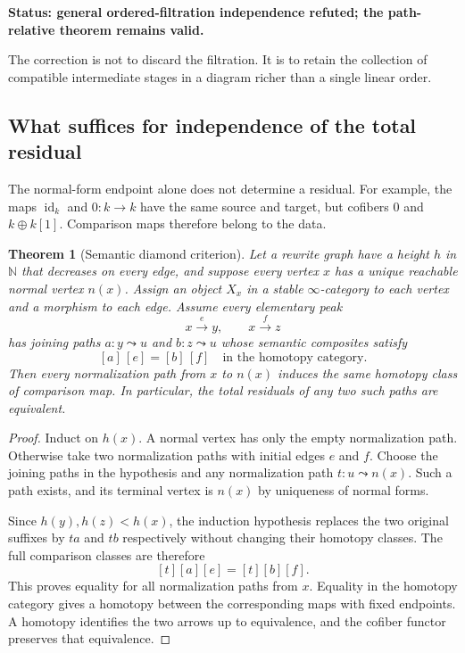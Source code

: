 \documentclass[11pt]{article}
\newtheorem{theorem}{Theorem}[section]
\theoremstyle{definition}
\theoremstyle{remark}
\newcommand{\id}{\operatorname{id}}
\newcommand{\status}[1]{\textbf{Status: #1.}}
\begin{document}
\status{general ordered-filtration independence refuted; the path-relative theorem remains valid}

The correction is not to discard the filtration. It is to retain the collection of compatible intermediate stages in a diagram richer than a single linear order.

\subsection{What suffices for independence of the total residual}

The normal-form endpoint alone does not determine a residual. For example, the maps $\id_k$ and $0:k\to k$ have the same source and target, but cofibers $0$ and $k\oplus k[1]$. Comparison maps therefore belong to the data.

\begin{theorem}[Semantic diamond criterion]\label{thm:semantic-diamond}
Let a rewrite graph have a height $h$ in $\mathbb N$ that decreases on every edge, and suppose every vertex $x$ has a unique reachable normal vertex $n(x)$. Assign an object $X_x$ in a stable $\infty$-category to each vertex and a morphism to each edge. Assume every elementary peak
\[
x\xrightarrow{e}y,\qquad x\xrightarrow{f}z
\]
has joining paths $a:y\leadsto u$ and $b:z\leadsto u$ whose semantic composites satisfy
\[
[a]\,[e]=[b]\,[f]\quad\text{in the homotopy category}.
\]
Then every normalization path from $x$ to $n(x)$ induces the same homotopy class of comparison map. In particular, the total residuals of any two such paths are equivalent.
\end{theorem}

\begin{proof}
Induct on $h(x)$. A normal vertex has only the empty normalization path. Otherwise take two normalization paths with initial edges $e$ and $f$. Choose the joining paths in the hypothesis and any normalization path $t:u\leadsto n(x)$. Such a path exists, and its terminal vertex is $n(x)$ by uniqueness of normal forms.

Since $h(y),h(z)<h(x)$, the induction hypothesis replaces the two original suffixes by $ta$ and $tb$ respectively without changing their homotopy classes. The full comparison classes are therefore
\[
[t][a][e]=[t][b][f].
\]
This proves equality for all normalization paths from $x$. Equality in the homotopy category gives a homotopy between the corresponding maps with fixed endpoints. A homotopy identifies the two arrows up to equivalence, and the cofiber functor preserves that equivalence.
\end{proof}
\end{document}
